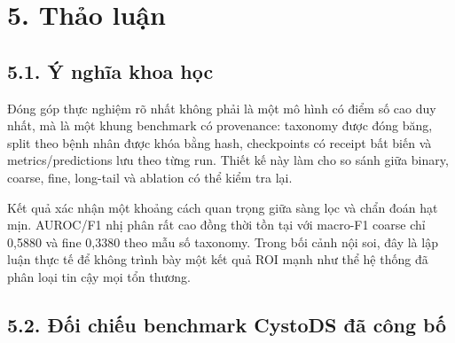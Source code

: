 \documentclass[
  10pt,
  a4paper,
  twocolumn]{article}
\begin{document}
\section{5. Thảo luận}\label{thux1ea3o-luux1eadn}

\subsection{5.1. Ý nghĩa khoa học}\label{uxfd-nghux129a-khoa-hux1ecdc}

Đóng góp thực nghiệm rõ nhất không phải là một mô hình có điểm số cao
duy nhất, mà là một khung benchmark có provenance: taxonomy được đóng
băng, split theo bệnh nhân được khóa bằng hash, checkpoints có receipt
bất biến và metrics/predictions lưu theo từng run. Thiết kế này làm cho
so sánh giữa binary, coarse, fine, long-tail và ablation có thể kiểm tra
lại.

Kết quả xác nhận một khoảng cách quan trọng giữa sàng lọc và chẩn đoán
hạt mịn. AUROC/F1 nhị phân rất cao đồng thời tồn tại với macro-F1 coarse
chỉ 0,5880 và fine 0,3380 theo mẫu số taxonomy. Trong bối cảnh nội soi,
đây là lập luận thực tế để không trình bày một kết quả ROI mạnh như thể
hệ thống đã phân loại tin cậy mọi tổn thương.

\subsection{5.2. Đối chiếu benchmark CystoDS đã công
bố}\label{ux111ux1ed1i-chiux1ebfu-benchmark-cystods-ux111uxe3-cuxf4ng-bux1ed1}
\end{document}
